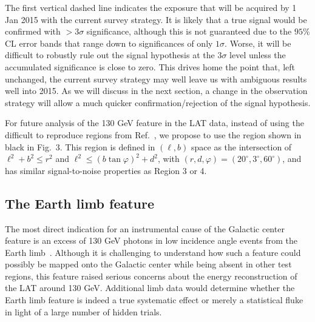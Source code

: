\documentclass[aps,prd,superscriptaddress,showpacs,nofootinbib,fixlfloat, 12pt]{revtex4-1}
\begin{document}
The first vertical dashed line indicates the exposure that will be acquired
by 1 Jan 2015 with the current survey strategy. It is likely that a true signal would be confirmed
with $>3\sigma$ significance, although this is not guaranteed due to the
$95\%$ CL error bands that range down to significances of only
$1\sigma$. Worse, it will be difficult to robustly rule out the signal hypothesis at
the $3\sigma$ level unless the accumulated significance is close to zero.
This drives home the point that, left unchanged, the current survey strategy
may well leave us with ambiguous results well into 2015. 
As we will discuss in the next section, a change in the observation strategy
will allow a much quicker confirmation/rejection of the signal hypothesis.

\medskip
For future analysis of the 130 GeV feature in the LAT data, instead of using the difficult to reproduce regions from
Ref.~\cite{Weniger:2012}, we propose to use the region shown in black in
Fig.~3. This region is defined in $(\ell, b)$ space as the intersection of
$\ell^2+b^2\leq r^2$ and $\ell^2\leq (b\tan\varphi)^2 + d^2$, with $(r,
d, \varphi) = (20^\circ, 3^\circ, 60^\circ)$, and has similar signal-to-noise
properties as Region 3 or 4. 

\subsection{The Earth limb feature}
The most direct indication for an instrumental cause of the Galactic center
feature is an excess of 130 GeV photons in low incidence angle events from
the Earth limb~\cite{linepaper, finkbeiner_systematics, Hektor:2012ev,
bloom_charles_fermi_lat_line}. Although it is challenging to understand how
such a feature could possibly be mapped onto the Galactic center while being
absent in other test regions, this feature raised serious concerns about the
energy reconstruction of the LAT around 130 GeV.  Additional limb data would
determine whether the Earth limb feature is indeed a true systematic effect or
merely a statistical fluke in light of a large number of hidden trials.
\end{document}
